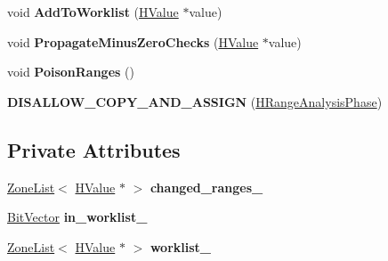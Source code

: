 \begin{DoxyCompactItemize}
\item 
void {\bfseries Add\+To\+Worklist} (\hyperlink{classv8_1_1internal_1_1_h_value}{H\+Value} $\ast$value)\hypertarget{classv8_1_1internal_1_1_h_range_analysis_phase_af75612c69eb0b4d655bba94c9d6b3052}{}\label{classv8_1_1internal_1_1_h_range_analysis_phase_af75612c69eb0b4d655bba94c9d6b3052}

\item 
void {\bfseries Propagate\+Minus\+Zero\+Checks} (\hyperlink{classv8_1_1internal_1_1_h_value}{H\+Value} $\ast$value)\hypertarget{classv8_1_1internal_1_1_h_range_analysis_phase_a21e6f4735c2a23a662f5766fe65dd335}{}\label{classv8_1_1internal_1_1_h_range_analysis_phase_a21e6f4735c2a23a662f5766fe65dd335}

\item 
void {\bfseries Poison\+Ranges} ()\hypertarget{classv8_1_1internal_1_1_h_range_analysis_phase_a2d5aec050826ab5f27e399d9e00ffaec}{}\label{classv8_1_1internal_1_1_h_range_analysis_phase_a2d5aec050826ab5f27e399d9e00ffaec}

\item 
{\bfseries D\+I\+S\+A\+L\+L\+O\+W\+\_\+\+C\+O\+P\+Y\+\_\+\+A\+N\+D\+\_\+\+A\+S\+S\+I\+GN} (\hyperlink{classv8_1_1internal_1_1_h_range_analysis_phase}{H\+Range\+Analysis\+Phase})\hypertarget{classv8_1_1internal_1_1_h_range_analysis_phase_addf3befa9ad4a19eb291acd9bda9529e}{}\label{classv8_1_1internal_1_1_h_range_analysis_phase_addf3befa9ad4a19eb291acd9bda9529e}

\end{DoxyCompactItemize}
\subsection*{Private Attributes}
\begin{DoxyCompactItemize}
\item 
\hyperlink{classv8_1_1internal_1_1_zone_list}{Zone\+List}$<$ \hyperlink{classv8_1_1internal_1_1_h_value}{H\+Value} $\ast$ $>$ {\bfseries changed\+\_\+ranges\+\_\+}\hypertarget{classv8_1_1internal_1_1_h_range_analysis_phase_a24f46837be0b91630be0435d7bb9a21d}{}\label{classv8_1_1internal_1_1_h_range_analysis_phase_a24f46837be0b91630be0435d7bb9a21d}

\item 
\hyperlink{classv8_1_1internal_1_1_bit_vector}{Bit\+Vector} {\bfseries in\+\_\+worklist\+\_\+}\hypertarget{classv8_1_1internal_1_1_h_range_analysis_phase_a38289edc80fc1ea8b1c9059c6e3dc1e3}{}\label{classv8_1_1internal_1_1_h_range_analysis_phase_a38289edc80fc1ea8b1c9059c6e3dc1e3}

\item 
\hyperlink{classv8_1_1internal_1_1_zone_list}{Zone\+List}$<$ \hyperlink{classv8_1_1internal_1_1_h_value}{H\+Value} $\ast$ $>$ {\bfseries worklist\+\_\+}\hypertarget{classv8_1_1internal_1_1_h_range_analysis_phase_aed83f09a0e6c5743ecdf2a420c6a17e2}{}\label{classv8_1_1internal_1_1_h_range_analysis_phase_aed83f09a0e6c5743ecdf2a420c6a17e2}

\end{DoxyCompactItemize}
